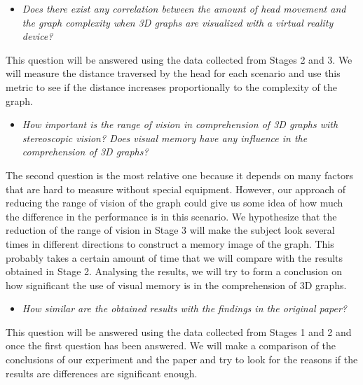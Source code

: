 \begin{itemize}
\item
  \emph{Does there exist any correlation between the amount of head
  movement and the graph complexity when 3D graphs are visualized with a
  virtual reality device?}
\end{itemize}

This question will be answered using the data collected from Stages 2
and 3. We will measure the distance traversed by the head for each
scenario and use this metric to see if the distance increases
proportionally to the complexity of the graph.

\begin{itemize}
\item
  \emph{How important is the range of vision in comprehension of 3D
  graphs with stereoscopic vision? Does visual memory have any influence
  in the comprehension of 3D graphs?}
\end{itemize}

The second question is the most relative one because it depends on many
factors that are hard to measure without special equipment. However, our
approach of reducing the range of vision of the graph could give us some
idea of how much the difference in the performance is in this scenario.
We hypothesize that the reduction of the range of vision in Stage 3 will
make the subject look several times in different directions to construct
a memory image of the graph. This probably takes a certain amount of
time that we will compare with the results obtained in Stage 2.
Analysing the results, we will try to form a conclusion on how
significant the use of visual memory is in the comprehension of 3D
graphs.

\begin{itemize}
\item
  \emph{How similar are the obtained results with the findings in the
  original paper?}
\end{itemize}

This question will be answered using the data collected from Stages 1
and 2 and once the first question has been answered. We will make a
comparison of the conclusions of our experiment and the paper and try to
look for the reasons if the results are differences are significant
enough.


